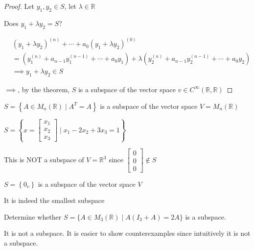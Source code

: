 \begin{proof}
	Let $y_1, y_2 \in S$, let $\lambda \in \mathbb{R}$

	Does $y_1 + \lambda y_2 = S$?

	\begin{align}
		&(y_1 + \lambda y_2)^{(n)} + \cdots + a_0(y_1 + \lambda y_2)^{(0)}\\
		&= (y_1^{(n)} + a_{n-1}y_1^{(n-1)} + \cdots + a_0y_1) + \lambda (y_2^{(n)} + a_{n-1}y_2^{(n-1)} + \cdots + a_0y_2)\\
		&\implies y_1 + \lambda y_2 \in S
	\end{align}

	$\implies$, by the theorem, $S$ is a subspace of the vector space $v \in C^{\infty}(\mathbb{R}, \mathbb{R})$
\end{proof}

\begin{example}
	$S = \left\{A \in M_n(\mathbb{R}) \mid A^T = A\right\}$ is a subspace of the vector space $V = M_n(\mathbb{R})$
\end{example}

\begin{example}
	$S = \left\{x = \begin{bmatrix}
		x_1\\x_2\\x_3
	\end{bmatrix} \mid x_1 - 2x_2+3x_3=1\right\}$
\end{example}

\begin{sol}
	This is NOT a subspace of $V = \mathbb{R}^3$ since $\begin{bmatrix}
		0\\0\\0
	\end{bmatrix} \not\in S$
\end{sol}

\begin{example}
	$S = \left\{0_v\right\}$ is a subspace of the vector space $V$
\end{example}

\begin{sol}
	It is indeed the smallest subspace 
\end{sol}

\begin{example}[Quiz 4]
	Determine whether $S = \{A \in M_3(\mathbb{R}) \mid A(I_3 + A) = 2A\}$ is a subspace.
\end{example}

\begin{sol}
	It is not a subspace. It is easier to show counterexamples since intuitively it is not a subspace.
\end{sol}

